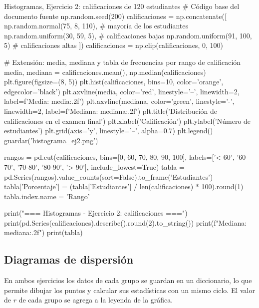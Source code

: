 \documentclass[11pt,letterpaper]{article}
\begin{document}
\begin{codigo}[label=cod:hist2]{Histogramas, Ejercicio 2: calificaciones de 120 estudiantes}
# Código base del documento fuente
np.random.seed(200)
calificaciones = np.concatenate([
    np.random.normal(75, 8, 110),   # mayoría de los estudiantes
    np.random.uniform(30, 59, 5),   # calificaciones bajas
    np.random.uniform(91, 100, 5)   # calificaciones altas
])
calificaciones = np.clip(calificaciones, 0, 100)

# Extensión: media, mediana y tabla de frecuencias por rango de calificación
media, mediana = calificaciones.mean(), np.median(calificaciones)
plt.figure(figsize=(8, 5))
plt.hist(calificaciones, bins=10, color='orange', edgecolor='black')
plt.axvline(media, color='red', linestyle='--', linewidth=2, label=f'Media: {media:.2f}')
plt.axvline(mediana, color='green', linestyle='-', linewidth=2, label=f'Mediana: {mediana:.2f}')
plt.title('Distribución de calificaciones en el examen final')
plt.xlabel('Calificación')
plt.ylabel('Número de estudiantes')
plt.grid(axis='y', linestyle='--', alpha=0.7)
plt.legend()
guardar('histograma_ej2.png')

rangos = pd.cut(calificaciones, bins=[0, 60, 70, 80, 90, 100],
                labels=['< 60', '60-70', '70-80', '80-90', '> 90'], include_lowest=True)
tabla = pd.Series(rangos).value_counts(sort=False).to_frame('Estudiantes')
tabla['Porcentaje'] = (tabla['Estudiantes'] / len(calificaciones) * 100).round(1)
tabla.index.name = 'Rango'

print("\n=== Histogramas - Ejercicio 2: calificaciones ===")
print(pd.Series(calificaciones).describe().round(2).to_string())
print(f"Mediana: {mediana:.2f}")
print(tabla)
\end{codigo}

\subsection{Diagramas de dispersión}

En ambos ejercicios los datos de cada grupo se guardan en un diccionario, lo que permite dibujar los puntos y calcular sus estadísticas con un mismo ciclo. El valor de $r$ de cada grupo se agrega a la leyenda de la gráfica.
\end{document}
